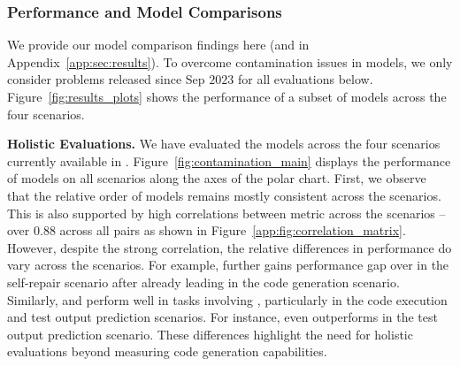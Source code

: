 \subsubsection{Performance and Model Comparisons}
\label{subsec:model_comparisions}
We provide our model comparison findings here (and in Appendix~\ref{app:sec:results}).
To overcome contamination issues in \deepseek{} models, we only consider problems released since Sep $2023$ for all evaluations below.
Figure~\ref{fig:results_plots} shows the performance of a subset of models across the four scenarios. 


\noindent \textbf{Holistic Evaluations.}
We have evaluated the models across the four scenarios currently available in \livecodebench{}.
Figure~\ref{fig:contamination_main} displays the performance of models on all scenarios along the axes of the polar chart.
First, we observe that the relative order of models remains mostly consistent across the scenarios.
This is also supported by high correlations between  metric across the scenarios -- 
over $0.88$ across all pairs as shown in Figure~\ref{app:fig:correlation_matrix}.
However, despite the strong correlation, the relative differences in performance do vary across the scenarios.
For example, \gptfourturbo{} further gains performance gap over \gptfour{} in the self-repair scenario after already leading in the code generation scenario.
Similarly, \claudeopus{} and \mistrallarge{} perform well in tasks involving \chainot{}, particularly in the code execution and test output prediction scenarios.
For instance, \claudeopus{} even outperforms \gptfourturbo{} in the test output prediction scenario.
These differences highlight the need for holistic evaluations beyond measuring code generation capabilities.



